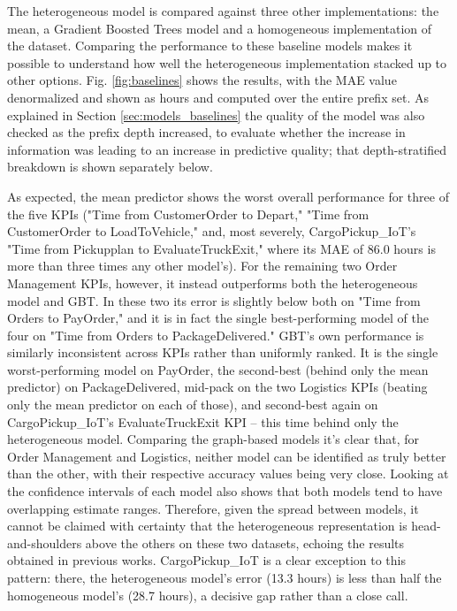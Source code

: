         The heterogeneous model is compared against three other implementations: the mean, a Gradient Boosted Trees model and a homogeneous implementation of the dataset. Comparing the performance to these baseline models makes it possible to understand how well the heterogeneous implementation stacked up to other options.
        Fig. \ref{fig:baselines} shows the results, with the MAE value denormalized and shown as hours and computed over the entire prefix set. As explained in Section \ref{sec:models_baselines} the quality of the model was also checked as the prefix depth increased, to evaluate whether the increase in information was leading to an increase in predictive quality; that depth-stratified breakdown is shown separately below.

        As expected, the mean predictor shows the worst overall performance for three of the five KPIs ("Time from CustomerOrder to Depart," "Time from CustomerOrder to LoadToVehicle," and, most severely, CargoPickup\_IoT's "Time from Pickupplan to EvaluateTruckExit," where its MAE of 86.0 hours is more than three times any other model's). For the remaining two Order Management KPIs, however, it instead outperforms both the heterogeneous model and GBT. In these two its error is slightly below both on "Time from Orders to PayOrder," and it is in fact the single best-performing model of the four on "Time from Orders to PackageDelivered." GBT's own performance is similarly inconsistent across KPIs rather than uniformly ranked. It is the single worst-performing model on PayOrder, the second-best (behind only the mean predictor) on PackageDelivered, mid-pack on the two Logistics KPIs (beating only the mean predictor on each of those), and second-best again on CargoPickup\_IoT's EvaluateTruckExit KPI -- this time behind only the heterogeneous model.
        Comparing the graph-based models it's clear that, for Order Management and Logistics, neither model can be identified as truly better than the other, with their respective accuracy values being very close. Looking at the confidence intervals of each model also shows that both models tend to have overlapping estimate ranges. Therefore, given the spread between models, it cannot be claimed with certainty that the heterogeneous representation is head-and-shoulders above the others on these two datasets, echoing the results obtained in previous works. CargoPickup\_IoT is a clear exception to this pattern: there, the heterogeneous model's error (13.3 hours) is less than half the homogeneous model's (28.7 hours), a decisive gap rather than a close call.
